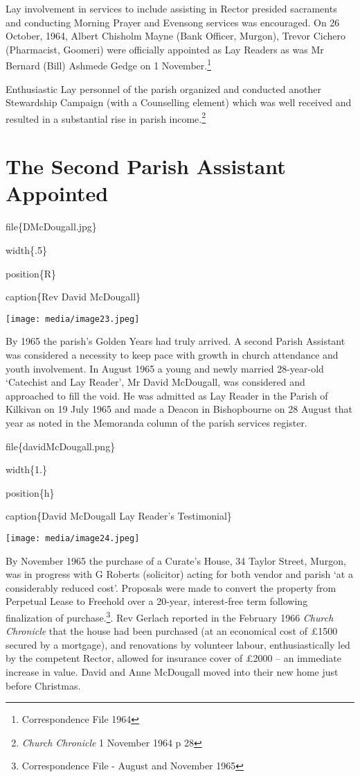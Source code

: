 Lay involvement in services to include assisting in Rector presided
sacraments and conducting Morning Prayer and Evensong services was
encouraged. On 26 October, 1964, Albert Chisholm Mayne (Bank Officer,
Murgon), Trevor Cichero (Pharmacist, Goomeri) were officially appointed
as Lay Readers as was Mr Bernard (Bill) Ashmede Gedge on 1
November.\footnote{Correspondence File 1964}

Enthusiastic Lay personnel of the parish organized and conducted another
Stewardship Campaign (with a Counselling element) which was well
received and resulted in a substantial rise in parish income.\footnote{\emph{Church
  Chronicle} 1 November 1964 p 28}

\hypertarget{the-second-parish-assistant-appointed}{%
\section{The Second Parish Assistant
Appointed}\label{the-second-parish-assistant-appointed}}

file\{DMcDougall.jpg\}

width\{.5\}

position\{R\}

caption\{Rev David McDougall\}

\texttt{[image: media/image23.jpeg]}

By 1965 the parish's Golden Years had truly arrived. A second Parish
Assistant was considered a necessity to keep pace with growth in church
attendance and youth involvement. In August 1965 a young and newly
married 28-year-old `Catechist and Lay Reader', Mr David McDougall, was
considered and approached to fill the void. He was admitted as Lay
Reader in the Parish of Kilkivan on 19 July 1965 and made a Deacon in
Bishopbourne on 28 August that year as noted in the Memoranda column of
the parish services register.

file\{davidMcDougall.png\}

width\{1.\}

position\{h\}

caption\{David McDougall Lay Reader's Testimonial\}

\texttt{[image: media/image24.jpeg]}

By November 1965 the purchase of a Curate's House, 34 Taylor Street,
Murgon, was in progress with G Roberts (solicitor) acting for both
vendor and parish `at a considerably reduced cost'. Proposals were made
to convert the property from Perpetual Lease to Freehold over a 20-year,
interest-free term following finalization of purchase.\footnote{Correspondence
  File - August and November 1965}. Rev Gerlach reported in the February
1966 \emph{Church Chronicle} that the house had been purchased (at an
economical cost of £1500 secured by a mortgage), and renovations by
volunteer labour, enthusiastically led by the competent Rector, allowed
for insurance cover of £2000 -- an immediate increase in value. David
and Anne McDougall moved into their new home just before Christmas.

